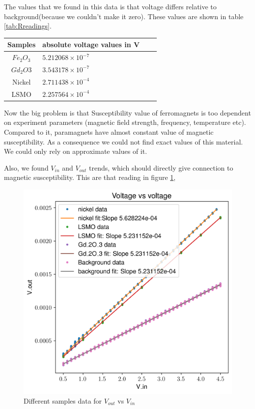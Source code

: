 The values that we found in this data is that voltage differs relative to background(because we couldn’t make it zero). These values are shown in table \ref{tab:Rreadings}.
\noindent\setlength\tabcolsep{4pt}%
\begin{center}
\begin{tabularx}{.83\linewidth}{| c |Y| c |Y  }
  \hline
  \hline
  Samples & absolute voltage values in V \\
  \hline
  $Fe_2O_3$ & $5.212068 \times 10^{-7}$ \\
  $Gd_2O3$ & $3.543178\times 10^{-7}$ \\
  Nickel & $2.711438 \times 10^{-4}$ \\
LSMO &  $2.257564 \times 10^{-4}$\\
\hline
\hline
\end{tabularx}
\label{tab:Rreadings}
\vskip1cm
\end{center}

Now the big problem is that Susceptibility value of ferromagnets is too dependent on experiment parameters (magnetic field strength, frequency, temperature etc). Compared to it, paramagnets have almost constant value of magnetic susceptibility. As a consequence we could not find exact values of this material. We could only rely on approximate values of it. 

Also, we found $V_{in}$ and $V_{out}$ trends, which should directly give connection to magnetic susceptibility. This are that reading in figure \ref{fig:voltage},

\begin{figure}[hbt!]
  \includegraphics[width= \linewidth]{plots/voltage.png}
  \caption{Different samples data for $V_{out}$ vs $V_{in}$}
  \label{fig:voltage}
\end{figure}

